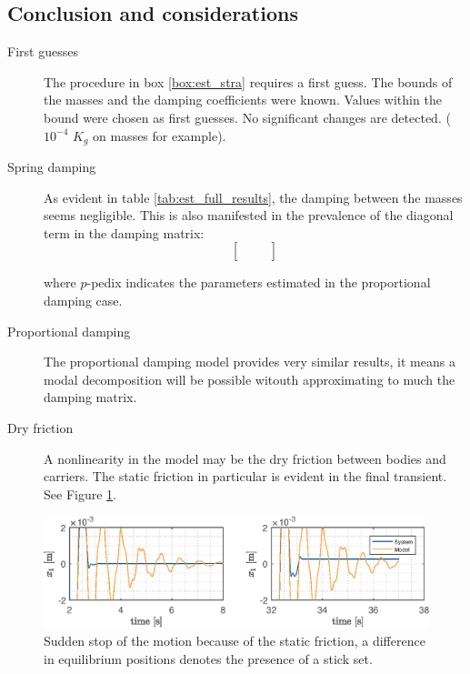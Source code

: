 \documentclass[twosided,a4paper]{article}           %
\newcommand{\rs}[1]{}
\newcounter{box}
\begin{document}
\subsection{Conclusion and considerations}
\begin{description}
	\item[First guesses] The procedure in box \ref{box:est_stra} requires a first guess. The bounds of the masses and the damping coefficients were known. Values within the bound were chosen as first guesses. No significant changes are detected. ($10^{-4}$ $K_g$ on masses for example).
	\item[Spring damping] As evident in table \ref{tab:est_full_results}, the damping between the masses seems negligible. This is also manifested in the prevalence of the diagonal term in the damping matrix:
\begin{equation}
\left [\begin{array}{ccc}
	\rs{Cdamp11} & \rs{Cdamp12} & \rs{Cdamp13} \\ 
	\rs{Cdamp21} & \rs{Cdamp22} & \rs{Cdamp23} \\ 
	\rs{Cdamp31} & \rs{Cdamp32} & \rs{Cdamp33}
\end{array} \right ] 
\end{equation}

	where $p$-pedix indicates the parameters estimated in the proportional damping case.
	\item[Proportional damping] The proportional damping model provides very similar results, it means a modal decomposition will be possible witouth approximating to much the damping matrix.
	\item[Dry friction] A nonlinearity in the model may be the dry friction between bodies and carriers. The static friction in particular is evident in the final transient. See Figure \ref{fig:dryfric}.
\end{description}
\begin{figure}[H]
	\centering
	\includegraphics[width=.8\linewidth]{img/dry_fric}
	\caption{Sudden stop of the motion because of the static friction, a difference in equilibrium positions denotes the presence of a stick set.}
	\label{fig:dryfric}
\end{figure}
\end{document}

